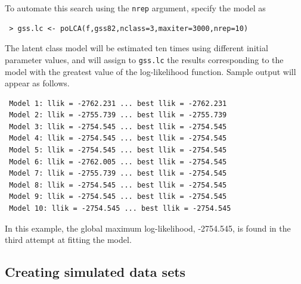 \documentclass[letterpaper,12pt]{article}
\begin{document}
To automate this search using the \texttt{nrep} argument, specify the model as
\begin{verbatim}
 > gss.lc <- poLCA(f,gss82,nclass=3,maxiter=3000,nrep=10)
\end{verbatim}
The latent class model will be estimated ten times using different initial parameter values, and will assign to \texttt{gss.lc} the results corresponding to the model with the greatest value of the log-likelihood function.  Sample output will appear as follows.
\begin{verbatim}
 Model 1: llik = -2762.231 ... best llik = -2762.231
 Model 2: llik = -2755.739 ... best llik = -2755.739
 Model 3: llik = -2754.545 ... best llik = -2754.545
 Model 4: llik = -2754.545 ... best llik = -2754.545
 Model 5: llik = -2754.545 ... best llik = -2754.545
 Model 6: llik = -2762.005 ... best llik = -2754.545
 Model 7: llik = -2755.739 ... best llik = -2754.545
 Model 8: llik = -2754.545 ... best llik = -2754.545
 Model 9: llik = -2754.545 ... best llik = -2754.545
 Model 10: llik = -2754.545 ... best llik = -2754.545
\end{verbatim}
In this example, the global maximum log-likelihood, -2754.545, is found in the third attempt at fitting the model.


\subsection{Creating simulated data sets}
\end{document}
